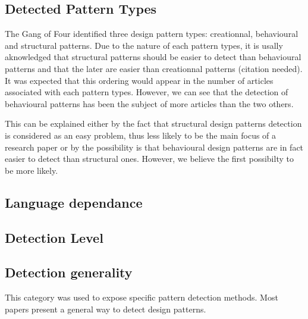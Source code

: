 \documentclass[letterpaper, 10 pt, conference]{ieeeconf}  %
\begin{document}
\subsection{Detected Pattern Types}

The Gang of Four identified three design pattern types: creationnal,
behavioural and structural patterns.
Due to the nature of each pattern types, it is usally aknowledged that
structural patterns should be easier to detect than behavioural patterns and
that the later are easier than creationnal patterns (citation needed). 
It was expected that this ordering would appear in the number of articles
associated with each pattern types. 
However, we can see that the detection of behavioural patterns has been the
subject of more articles than the two others.


This can be explained either by the fact that structural design patterns
detection is considered as an easy problem, thus less likely to be the main
focus of a research paper or by the possibility is that behavioural design
patterns are in fact easier to detect than structural ones.
However, we believe the first possibilty to be more likely.



\subsection{Language dependance}





\subsection{Detection Level}



\subsection{Detection generality}

This category was used to expose specific pattern detection methods.
Most papers present a general way to detect design patterns.
\end{document}
